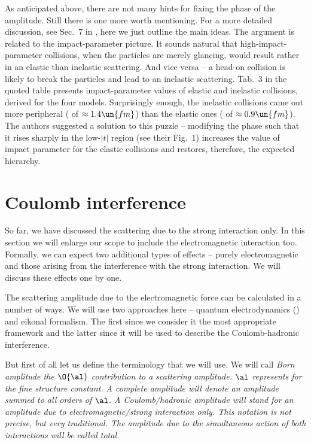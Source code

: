 As anticipated above, there are not many hints for fixing the phase of the amplitude. Still there is one more worth mentioning. For a more detailed discussion, see Sec.~7 in , here we just outline the main ideas. The argument is related to the impact-parameter picture. It sounds natural that high-impact-parameter collisions, when the particles are merely glancing, would result rather in an elastic than inelastic scattering. And vice versa -- a head-on collision is likely to break the particles and lead to an inelastic scattering. Tab.~3 in the quoted table presents  impact-parameter values of elastic and inelastic collisions, derived for the four models. Surprisingly enough, the inelastic collisions came out more peripheral ( of $\approx 1.4\un{fm}$) than the elastic ones ( of $\approx 0.9\un{fm}$). The authors suggested a solution to this puzzle -- modifying the phase such that it rises sharply in the low-$|t|$ region (see their Fig.~1) increases the  value of impact parameter for the elastic collisions and restores, therefore, the expected hierarchy.

\section[el coulomb]{Coulomb interference}

So far, we have discussed the scattering due to the strong interaction only. In this section we will enlarge our scope to include the electromagnetic interaction too. Formally, we can expect two additional types of effects -- purely electromagnetic and those arising from the interference with the strong interaction. We will discuss these effects one by one.

The scattering amplitude due to the electromagnetic force can be calculated in a number of ways. We will use two approaches here -- quantum electrodynamics () and eikonal formalism. The first since we consider it the most appropriate framework and the latter since it will be used to describe the Coulomb-hadronic interference.

But first of all let us define the terminology that we will use. We will call \em{Born amplitude} the $\O{\al}$ contribution to a scattering amplitude. $\al$ represents for the fine structure constant. A \em{complete} amplitude will denote an amplitude summed to all orders of $\al$. A \em{Coulomb}/\em{hadronic} amplitude will stand for an amplitude due to electromagnetic/strong interaction only. This notation is not precise, but very traditional. The amplitude due to the simultaneous action of both interactions will be called \em{total}.


